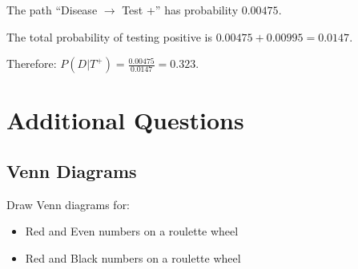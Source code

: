 \documentclass[11pt,a4paper]{article}
\begin{document}
\begin{answer}
\begin{center}
\begin{tikzpicture}
\end{tikzpicture}
\end{center}

\vspace{0.3cm}
The path ``Disease $\to$ Test +'' has probability $0.00475$.

The total probability of testing positive is $0.00475 + 0.00995 = 0.0147$.

Therefore: $P(D|T^+) = \frac{0.00475}{0.0147} = 0.323$.

\end{answer}

\newpage
\section{Additional Questions}

\subsection*{Venn Diagrams}

\begin{question}
Draw Venn diagrams for:
\begin{itemize}
    \item Red and Even numbers on a roulette wheel
    \item Red and Black numbers on a roulette wheel
\end{itemize}
\end{question}
\end{document}
